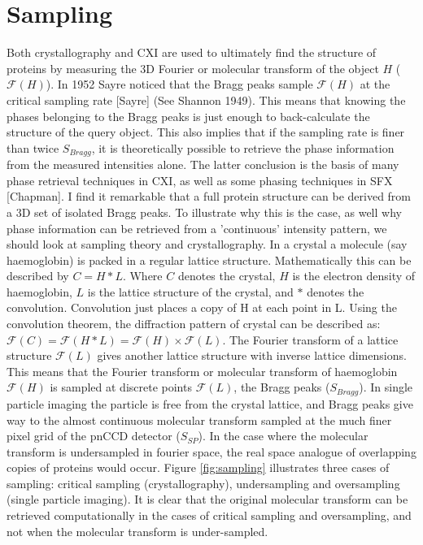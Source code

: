\section{Sampling} 
Both crystallography and CXI are used to ultimately find the structure of proteins by measuring the 3D Fourier or molecular transform of the object $H$ ($\mathcal{F}(H)$). In 1952 Sayre noticed that the Bragg peaks sample $\mathcal{F}(H)$ at the critical sampling rate [Sayre] (See Shannon 1949). This means that knowing the phases belonging to the Bragg peaks is just enough to back-calculate the structure of the query object. This also implies that if the sampling rate is finer than twice $S_{Bragg}$, it is theoretically possible to retrieve the phase information from the measured intensities alone. The latter conclusion is the basis of many phase retrieval techniques in CXI, as well as some phasing techniques in SFX [Chapman].
I find it remarkable that a full protein structure can be derived from a 3D set of isolated Bragg peaks. To illustrate why this is the case, as well why phase information can be retrieved from a 'continuous' intensity pattern, we should look at sampling theory and crystallography. In a crystal a molecule (say haemoglobin) is packed in a regular lattice structure. Mathematically this can be described by $C = H * L$. Where $C$ denotes the crystal, $H$ is the electron density of haemoglobin, $L$ is the lattice structure of the crystal, and $*$ denotes the convolution. Convolution just places a copy of H at each point in L. Using the convolution theorem, the diffraction pattern of crystal can be described as: $\mathcal{F}(C) = \mathcal{F}(H * L) = \mathcal{F}(H) \times \mathcal{F}(L)$. The Fourier transform of a lattice structure $\mathcal{F}(L)$ gives another lattice structure with inverse lattice dimensions. This means that the Fourier transform or molecular transform of haemoglobin $\mathcal{F}(H)$ is sampled at discrete points $\mathcal{F}(L)$, the Bragg peaks ($S_{Bragg}$). In single particle imaging the particle is free from the crystal lattice, and Bragg peaks give way to the almost continuous molecular transform sampled at the much finer pixel grid of the pnCCD detector ($S_{SP}$). In the case where the molecular transform is undersampled in fourier space, the real space analogue of overlapping copies of proteins would occur.
Figure \ref{fig:sampling} illustrates three cases of sampling: critical sampling (crystallography), undersampling and oversampling (single particle imaging). It is clear that the original molecular transform can be retrieved computationally in the cases of critical sampling and oversampling, and not when the molecular transform is under-sampled. 
